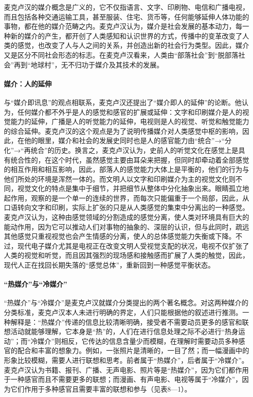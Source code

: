 \documentclass[UTF8,12pt]{ctexart}
\numberwithin{equation}{section} %
\numberwithin{figure}{section}
\numberwithin{table}{section}
\begin{document}
	麦克卢汉的媒介概念是广义的，它不仅指语言、文字、印刷物、电信和广播电视，而且包括各种交通运输工具，甚至服装、住宅、货币等，任何能够延伸人体功能的事物，都在他的媒介范畴之内。麦克卢汉认为，媒介是社会发展的基本动力，每一种新的媒介的产生，都开创了人类感知和认识世界的方式，传播中的变革改变了人类的感觉，也改变了人与人之间的关系，并创造出新的社会行为类型。因此，媒介又是区分不同社会形态的标志。在麦克卢汉看来，人类由“部落社会”到“脱部落社会”再到“地球村”，无不归功于媒介及其技术的发展。
	
	\paragraph{媒介：人的延伸}
	
	与“媒介即讯息”的观点相联系，麦克卢汉还提出了“媒介即人的延伸”的论断。他认为，任何媒介都不外乎是人的感觉和感官的扩展或延伸：文字和印刷媒介是人的视觉能力的延伸，广播是人的听觉能力的延伸，电视则是人的视觉、听觉和触觉能力的综合延伸。麦克卢汉的这个观点是为了说明传播媒介对人类感觉中枢的影响，因此，在他的眼里，媒介和社会的发展史同时也是人的感官能力由“统合”→“分化”→“再统合”的历史。换言之，麦克卢汉认为，史前人的听觉文化在感觉上是具有统合性的，在这个时代，虽然感觉主要由耳朵来把握，但同时却牵动着全部感觉的相互作用和相互影响，因此，部落人的感觉能力大体上是平衡的，他们的行为与他们所处的环境是浑然一体的。而文明人以文字和印刷媒介为主的视觉文化则不同，视觉文化的特点是集中于细节，并把细节从整体中分化抽象出来。眼睛孤立地起作用，观察的是一个单一的连续的世界，而每次只能偏重于一个局部，因此，从口语转向文字和印刷，实际上扩张的只是从人类感觉的集束中分离出的一种感觉。麦克卢汉认为，这种由感觉领域的分割造成的感觉分离，使人类对环境具有巨大的能动作用，因为它可以推动人们对事物的抽象的、深层的认识，但与此同时，疏远其他感觉只重视视觉也会产生情感的分离，使人的总体感觉能力失衡或下降。不过，现代电子媒介尤其是电视正在改变文明人受视觉支配的状况，电视不仅扩张了人类的视觉和听觉，而且因其强烈的现场感和接触感而扩展了人类的触觉，因此，现代人正在找回长期失落的“感觉总体”，重新回到一种感觉平衡状态。
	
	\paragraph{“热媒介”与“冷媒介”}
	
	“热媒介”与“冷媒介”是麦克卢汉就媒介分类提出的两个著名概念。对这两种媒介的分类标准，麦克卢汉本人未进行明确的界定，人们只能根据他的叙述进行推测。一种解释是：“热媒介”传递的信息比较清晰明确，接受者不需要动员更多的感官和联想活动就能够理解，它本身是“热”的，人们在进行信息处理之际不必进行“热身运动”；而“冷媒介”则相反，它传达的信息含量少而模糊，在理解时需要动员多种感官的配合和丰富的想象力。例如，一张照片是清晰的，一目了然；而一幅漫画中的形象比较模糊，需要人进行联想和思考。前者属于“热媒介”，后者属于“冷媒介”。麦克卢汉认为书籍、报刊、广播、无声电影、照片等是“热媒介”，因为它们都作用于一种感官而且不需要更多的联想；而漫画、有声电影、电视等属于“冷媒介”，因为它们作用于多种感官且需要丰富的联想和参与（见表8—1）。
	
\end{document}
